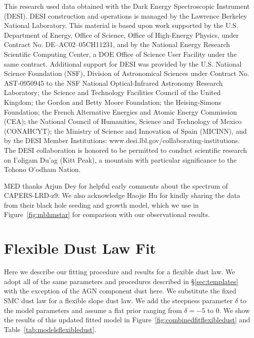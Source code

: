\documentclass[twocolumn]{aastex7}
\newcommand{\src}{CAPERS-LRD-z9}
\begin{document}
\begin{acknowledgements}
This research used data obtained with the Dark Energy Spectroscopic Instrument (DESI). DESI construction and operations is managed by the Lawrence Berkeley National Laboratory. This material is based upon work supported by the U.S. Department of Energy, Office of Science, Office of High-Energy Physics, under Contract No. DE–AC02–05CH11231, and by the National Energy Research Scientific Computing Center, a DOE Office of Science User Facility under the same contract. Additional support for DESI was provided by the U.S. National Science Foundation (NSF), Division of Astronomical Sciences under Contract No. AST-0950945 to the NSF National Optical-Infrared Astronomy Research Laboratory; the Science and Technology Facilities Council of the United Kingdom; the Gordon and Betty Moore Foundation; the Heising-Simons Foundation; the French Alternative Energies and Atomic Energy Commission (CEA); the National Council of Humanities, Science and Technology of Mexico (CONAHCYT); the Ministry of Science and Innovation of Spain (MICINN), and by the DESI Member Institutions: www.desi.lbl.gov/collaborating-institutions. The DESI collaboration is honored to be permitted to conduct scientific research on I’oligam Du’ag (Kitt Peak), a mountain with particular significance to the Tohono O’odham Nation.

MED thanks Arjun Dey for helpful early comments about the spectrum of \src{}. We also acknowledge Haojie Hu for kindly sharing the data from their black hole seeding and growth model, which we use in Figure~\ref{fig:mbhmstar} for comparison with our observational results.
\end{acknowledgements}







\appendix
\section{Flexible Dust Law Fit}\label{app:dustlaw}
Here we describe our fitting procedure and results for a flexible \citep{salim18} dust law. We adopt all of the same parameters and procedures described in \S\ref{sec:templates} with the exception of the AGN component dust here. We substitute the fixed SMC dust law for a flexible slope \citep{salim18} dust law. We add the steepness parameter $\delta$ to the model parameters and assume a flat prior ranging from $\delta=-5$ to $0$. We show the results of this updated fitted model in Figure~\ref{fig:combinedfitflexibledust} and Table~\ref{tab:modelsflexibledust}.
\end{document}
